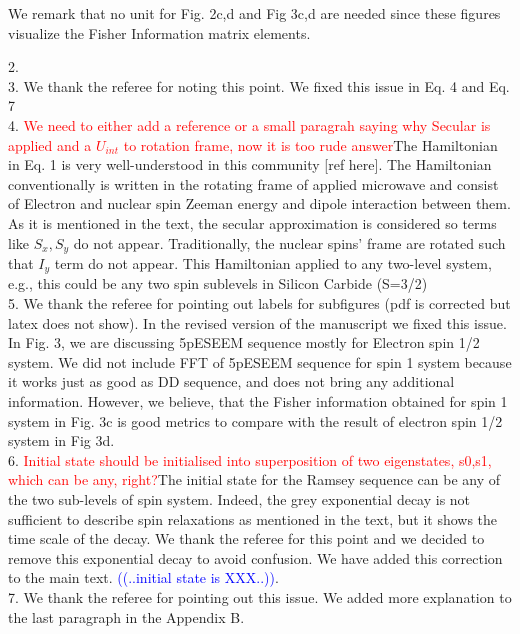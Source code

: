 \documentclass[12pt]{amsart}
\begin{document}
	We remark that no unit for Fig. 2c,d and Fig 3c,d are needed since these figures visualize the Fisher Information matrix elements. 
	
	2. \\
	
	3. We thank the referee for noting this point. We fixed this issue in Eq. 4 and Eq. 7  \\
	
	4. \textcolor{red}{We need to either add a reference or a small paragrah saying why Secular is applied and a $U_{int}$ to rotation frame, now it is too rude answer}The Hamiltonian in Eq. 1 is very well-understood in this community [ref here]. The Hamiltonian conventionally is written in the rotating frame of applied microwave and consist of Electron and nuclear spin Zeeman energy and dipole interaction between them. As it is mentioned in the text, the secular approximation is considered so terms like $S_x, S_y$ do not appear. Traditionally, the nuclear spins' frame are rotated such that $I_y$ term do not appear. This Hamiltonian applied to any two-level system, e.g., this could be any two spin sublevels in Silicon Carbide (S=3/2)\\
	
	5. We thank the referee for pointing out labels for subfigures (pdf is corrected but latex does not show). In the revised version of the manuscript we fixed this issue. 
	In Fig. 3, we are discussing 5pESEEM sequence mostly for Electron spin 1/2 system. 
	We did not include FFT of 5pESEEM sequence for spin 1 system because it works just as good as DD sequence, and does not bring any additional information. 
	However, we believe, that the Fisher information obtained for spin 1 system in Fig. 3c is good metrics to compare with the result of electron spin 1/2 system in Fig 3d.  \\
	
	6. \textcolor{red}{Initial state should be initialised into superposition of two eigenstates, s0,s1, which can be any, right?}The initial state for the Ramsey sequence can be any of the two sub-levels of spin system. Indeed, the grey exponential decay is not sufficient to describe spin relaxations as mentioned in the text, but it shows the time scale of the decay. We thank the referee for this point and we decided to remove this exponential decay to avoid confusion. We have added this correction to the main text.
	\textcolor{blue}{((..initial state is XXX..))}.\\
	 
	7. We thank the referee for pointing out this issue. We added more explanation to the last paragraph in the Appendix B.
	
\end{document}
